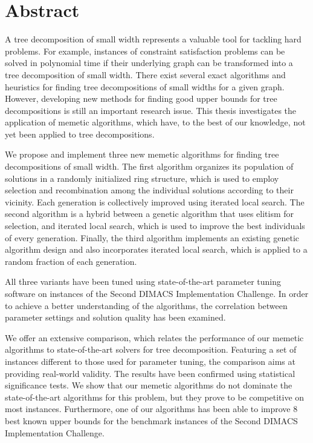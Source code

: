 \documentclass[thesis.tex]{subfiles}
\begin{document}
\chapter*{Abstract}

A tree decomposition of small width represents a valuable tool for tackling hard problems. For example, instances of constraint satisfaction problems can be solved in polynomial time if their underlying graph can be transformed into a tree decomposition of small width. There exist several exact algorithms and heuristics for finding tree decompositions of small widths for a given graph. However, developing new methods for finding good upper bounds for tree decompositions is still an important research issue. This thesis investigates the application of memetic algorithms, which have, to the best of our knowledge, not yet been applied to tree decompositions.

We propose and implement three new memetic algorithms for finding tree decompositions of small width. The first algorithm organizes its population of solutions in a randomly initialized ring structure, which is used to employ selection and recombination among the individual solutions according to their vicinity. Each generation is collectively improved using iterated local search. The second algorithm is a hybrid between a genetic algorithm that uses elitism for selection, and iterated local search, which is used to improve the best individuals of every generation. Finally, the third algorithm implements an existing genetic algorithm design and also incorporates iterated local search, which is applied to a random fraction of each generation.

All three variants have been tuned using state-of-the-art parameter tuning software on instances of the Second \gls{DIMACS} Implementation Challenge. In order to achieve a better understanding of the algorithms, the correlation between parameter settings and solution quality has been examined.

We offer an extensive comparison, which relates the performance of our memetic algorithms to state-of-the-art solvers for tree decomposition. Featuring a set of instances different to those used for parameter tuning, the comparison aims at providing real-world validity. The results have been confirmed using statistical significance tests. We show that our memetic algorithms do not dominate the state-of-the-art algorithms for this problem, but they prove to be competitive on most instances. Furthermore, one of our algorithms has been able to improve 8 best known upper bounds for the benchmark instances of the Second \gls{DIMACS} Implementation Challenge.

\end{document}
